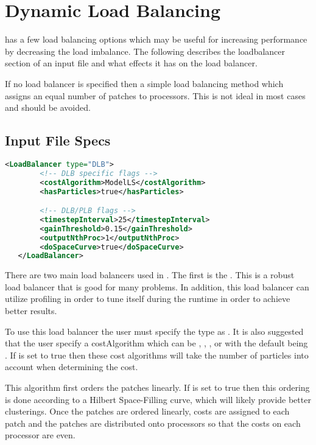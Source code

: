 \chapter{Dynamic Load Balancing} \label{loadbalancer}
\Vaango has a few load balancing options which may be useful for increasing performance by decreasing
the load imbalance.  The following describes the loadbalancer section of an input file and what effects
it has on the load balancer.  

If no load balancer is specified then a simple load balancing method which assigns an equal number of patches
to processors. This is not ideal in most cases and should be avoided.
\section{Input File Specs}
\begin{lstlisting}[language=XML]
   <LoadBalancer type="DLB"> 
        <!-- DLB specific flags -->
        <costAlgorithm>ModelLS</costAlgorithm>
        <hasParticles>true</hasParticles>

        <!-- DLB/PLB flags -->
        <timestepInterval>25</timestepInterval>
        <gainThreshold>0.15</gainThreshold>
        <outputNthProc>1</outputNthProc>
        <doSpaceCurve>true</doSpaceCurve>
   </LoadBalancer>
\end{lstlisting}

There are two main load balancers used in \Vaango.  The first is the .
This is a robust load balancer that is good for many problems.  In addition,
this load balancer can utilize profiling in order to tune itself during the runtime
in order to achieve better results.  

To use this load balancer the user must specify the type as .  It is also suggested
that the user specify a costAlgorithm which can be , , , or
 with the default being .  If  is set to true then
these cost algorithms will take the number of particles into account when determining
the cost.

This algorithm first orders the patches linearly.  If  is set to true
then this ordering is done according to a Hilbert Space-Filling curve, which will
likely provide better clusterings.  Once the patches are ordered linearly, costs
are assigned to each patch and the patches are distributed onto processors so that
the costs on each processor are even.  

